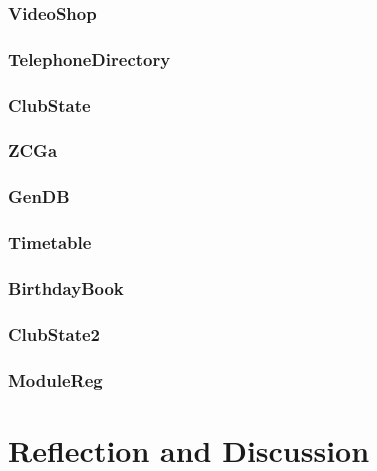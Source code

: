 \subsubsection{VideoShop}

\subsubsection{TelephoneDirectory}

\subsubsection{ClubState}

\subsubsection{ZCGa}

\subsubsection{GenDB}

\subsubsection{Timetable}

\subsubsection{BirthdayBook}

\subsubsection{ClubState2}

\subsubsection{ModuleReg}

\section{Reflection and Discussion}




